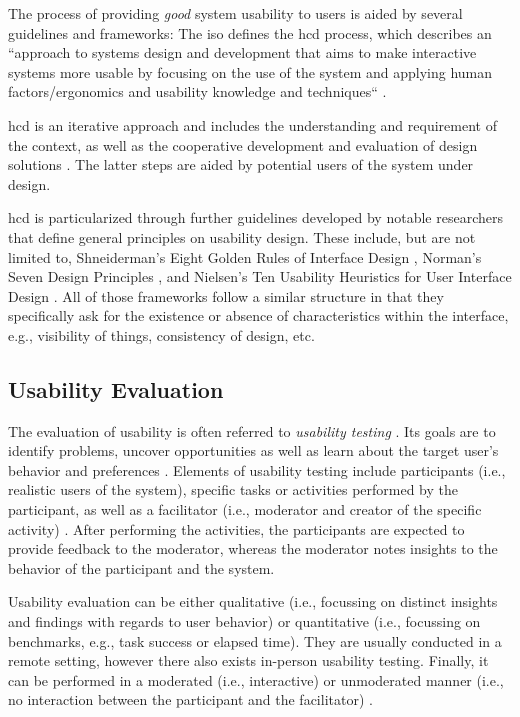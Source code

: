The process of providing \textit{good} system usability to users is aided by several guidelines and frameworks: The \ac{iso} defines the \ac{hcd} process, which describes an ``approach to systems design and development that aims to make interactive systems more usable by focusing on the use of the system and applying human factors/ergonomics and usability knowledge and techniques`` \cite{noauthor_ergonomics_2019}.

\ac{hcd} is an iterative approach and includes the understanding and requirement of the context, as well as the cooperative development and evaluation of design solutions \cite{noauthor_ergonomics_2019}. The latter steps are aided by potential users of the system under design.

\ac{hcd} is particularized through further guidelines developed by notable researchers that define general principles on usability design. These include, but are not limited to, Shneiderman's Eight Golden Rules of Interface Design \cite{shneiderman_designing_1987}, Norman's Seven Design Principles \cite{norman_design_2013}, and Nielsen's Ten Usability Heuristics for User Interface Design \cite{nielsen_heuristic_1990}. All of those frameworks follow a similar structure in that they specifically ask for the existence or absence of characteristics within the interface, e.g., visibility of things, consistency of design, etc.

\subsection{Usability Evaluation} \label{subs:foundations-usability-evaluation}

The evaluation of usability is often referred to \textit{usability testing} \cite{moran_usability_2019}. Its goals are to identify problems, uncover opportunities as well as learn about the target user's behavior and preferences \cite{moran_usability_2019}. Elements of usability testing include participants (i.e., realistic users of the system), specific tasks or activities performed by the participant, as well as a facilitator (i.e., moderator and creator of the specific activity) \cite{moran_usability_2019}. After performing the activities, the participants are expected to provide feedback to the moderator, whereas the moderator notes insights to the behavior of the participant and the system.

Usability evaluation can be either qualitative (i.e., focussing on distinct insights and findings with regards to user behavior) or quantitative (i.e., focussing on benchmarks, e.g., task success or elapsed time). They are usually conducted in a remote setting, however there also exists in-person usability testing. Finally, it can be performed in a moderated (i.e., interactive) or unmoderated manner (i.e., no interaction between the participant and the facilitator) \cite{moran_usability_2019}.


